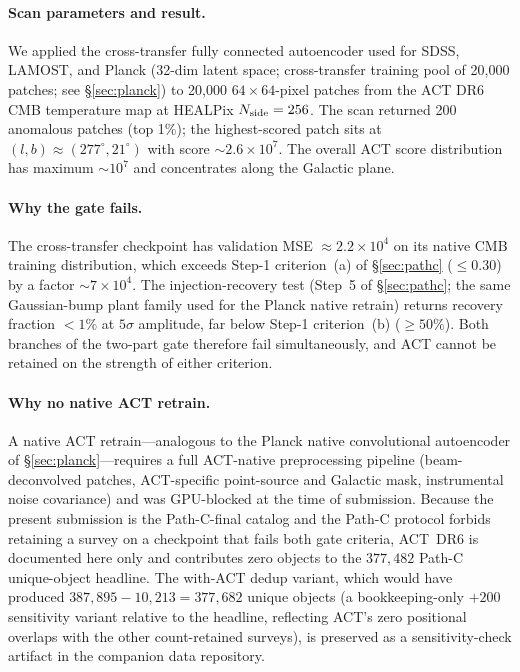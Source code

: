 \documentclass[aps,prd,twocolumn,superscriptaddress,showpacs,preprintnumbers,nofootinbib,longbibliography,floatfix]{revtex4-2}
\begin{document}
\paragraph{Scan parameters and result.} We applied the cross-transfer fully connected autoencoder used for SDSS, LAMOST, and Planck (32-dim latent space; cross-transfer training pool of 20{,}000 patches; see \S\ref{sec:planck}) to 20{,}000 $64\times 64$-pixel patches from the ACT DR6~\cite{ACT_DR6} CMB temperature map at HEALPix $N_{\rm side} = 256$. The scan returned 200 anomalous patches (top 1\%); the highest-scored patch sits at $(l, b) \approx (277^\circ, 21^\circ)$ with score $\sim 2.6 \times 10^{7}$. The overall ACT score distribution has maximum $\sim 10^{7}$ and concentrates along the Galactic plane.

\paragraph{Why the gate fails.} The cross-transfer checkpoint has validation MSE $\approx 2.2 \times 10^{4}$ on its native CMB training distribution, which exceeds Step-1 criterion~(a) of \S\ref{sec:pathc} ($\leq 0.30$) by a factor $\sim 7 \times 10^{4}$. The injection-recovery test (Step~5 of \S\ref{sec:pathc}; the same Gaussian-bump plant family used for the Planck native retrain) returns recovery fraction $<1\%$ at $5\sigma$ amplitude, far below Step-1 criterion~(b) ($\geq 50\%$). Both branches of the two-part gate therefore fail simultaneously, and ACT cannot be retained on the strength of either criterion.

\paragraph{Why no native ACT retrain.} A native ACT retrain---analogous to the Planck native convolutional autoencoder of \S\ref{sec:planck}---requires a full ACT-native preprocessing pipeline (beam-deconvolved patches, ACT-specific point-source and Galactic mask, instrumental noise covariance) and was GPU-blocked at the time of submission. Because the present submission is the Path-C-final catalog and the Path-C protocol forbids retaining a survey on a checkpoint that fails both gate criteria, ACT~DR6 is documented here only and contributes zero objects to the $377{,}482$ Path-C unique-object headline. The with-ACT dedup variant, which would have produced $387{,}895 - 10{,}213 = 377{,}682$ unique objects (a bookkeeping-only $+200$ sensitivity variant relative to the headline, reflecting ACT's zero positional overlaps with the other count-retained surveys), is preserved as a sensitivity-check artifact in the companion data repository.
\end{document}
